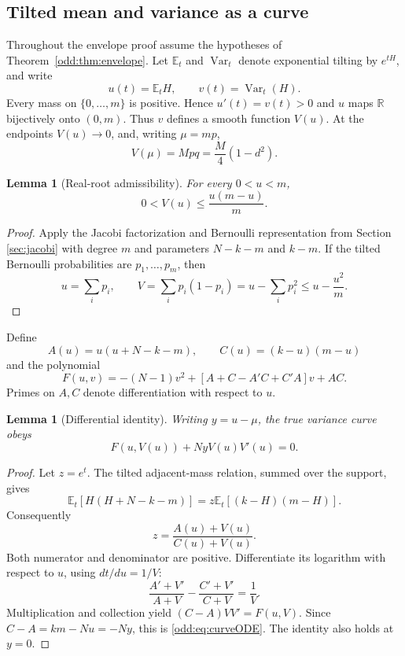 \documentclass[11pt,a4paper]{article}
\newtheorem{lemma}[theorem]{Lemma}
\DeclareMathOperator{\Var}{Var}\DeclareMathOperator{\Cov}{Cov}\DeclareMathOperator{\Hyp}{Hyp}\DeclareMathOperator{\Bern}{Bern}\DeclareMathOperator{\supp}{supp}\DeclareMathOperator{\artanh}{artanh}
\newcommand{\E}{\mathbb E}\newcommand{\R}{\mathbb R}\newcommand{\N}{\mathbb N}\newcommand{\one}{\mathbf1}
\begin{document}
\subsection{Tilted mean and variance as a curve}
Throughout the envelope proof assume the hypotheses of Theorem~\ref{odd:thm:envelope}.
Let $\E_t$ and $\Var_t$ denote exponential tilting by $e^{tH}$, and write
\[
 u(t)=\E_tH,\qquad v(t)=\Var_t(H).
\]
Every mass on $\{0,\ldots,m\}$ is positive. Hence $u'(t)=v(t)>0$ and $u$ maps $\R$ bijectively onto $(0,m)$. Thus $v$ defines a smooth function $V(u)$. At the endpoints $V(u)\to0$, and, writing $\mu=mp$,
\begin{equation}\label{odd:eq:variance0}
 V(\mu)=Mpq=\frac M4(1-d^2).
\end{equation}

\begin{lemma}[Real-root admissibility]\label{odd:lem:PB}
For every $0<u<m$,
\begin{equation}\label{odd:eq:PB}
 0<V(u)\le\frac{u(m-u)}m.
\end{equation}
\end{lemma}
\begin{proof}
Apply the Jacobi factorization and Bernoulli representation from Section \ref{sec:jacobi} with degree $m$ and parameters $N-k-m$ and $k-m$. If the tilted Bernoulli probabilities are $p_1,\ldots,p_m$, then
\[
 u=\sum_i p_i,\qquad V=\sum_i p_i(1-p_i)
 =u-\sum_i p_i^2\le u-\frac{u^2}{m}.
\]
\end{proof}

Define
\[
 A(u)=u(u+N-k-m),\qquad C(u)=(k-u)(m-u)
\]
and the polynomial
\begin{equation}\label{odd:eq:F}
 F(u,v)=-(N-1)v^2+[A+C-A'C+C'A]v+AC.
\end{equation}
Primes on $A,C$ denote differentiation with respect to $u$.

\begin{lemma}[Differential identity]\label{odd:lem:ode}
Writing $y=u-\mu$, the true variance curve obeys
\begin{equation}\label{odd:eq:curveODE}
 F(u,V(u))+NyV(u)V'(u)=0.
\end{equation}
\end{lemma}
\begin{proof}
Let $z=e^t$. The tilted adjacent-mass relation, summed over the support, gives
\[
 \E_t[H(H+N-k-m)]=z\E_t[(k-H)(m-H)].
\]
Consequently
\[
 z=\frac{A(u)+V(u)}{C(u)+V(u)}.
\]
Both numerator and denominator are positive. Differentiate its logarithm with respect to $u$, using $dt/du=1/V$:
\[
 \frac{A'+V'}{A+V}-\frac{C'+V'}{C+V}=\frac1V.
\]
Multiplication and collection yield $(C-A)VV'=F(u,V)$. Since $C-A=km-Nu=-Ny$, this is \eqref{odd:eq:curveODE}. The identity also holds at $y=0$.
\end{proof}
\end{document}
